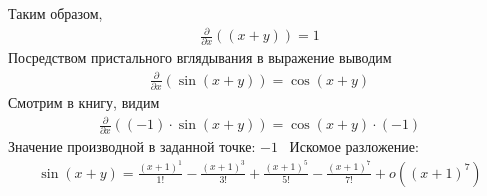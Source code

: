 \documentclass{article}
\begin{document}
Таким образом,
\begin{gather}
\frac{\partial }{\partial x}\left(\left(x + y\right)\right)=1
\end{gather}
Посредством пристального вглядывания в выражение выводим
\begin{gather}
\frac{\partial }{\partial x}\left(\sin{ \left(x + y\right) }\right)=\cos{ \left(x + y\right) }
\end{gather}
Смотрим в книгу, видим
\begin{gather}
\frac{\partial }{\partial x}\left((-1) \cdot \sin{ \left(x + y\right) }\right)=\cos{ \left(x + y\right) } \cdot (-1)
\end{gather}
Значение производной в заданной точке: $-1$ \ 
Искомое разложение:
\begin{gather}
\sin{ \left(x + y\right) }=\frac{{(x+1)}^{1}}{1!}-\frac{{(x+1)}^{3}}{3!}+\frac{{(x+1)}^{5}}{5!}-\frac{{(x+1)}^{7}}{7!}+o({(x+1)}^{7})\end{gather}
\end{document}
